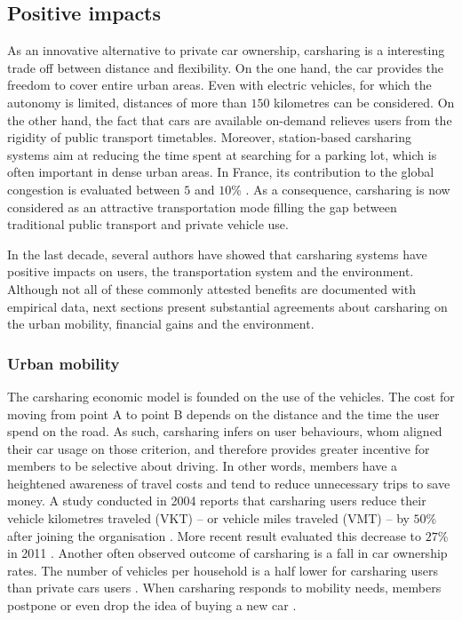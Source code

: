 \begin{bibunit}[ieeetr]
\subsection{Positive impacts}
As an innovative alternative to private car ownership, carsharing is a interesting trade off between distance and flexibility.
On the one hand, the car provides the freedom to cover entire urban areas.
Even with electric vehicles, for which the autonomy is limited, distances of more than $150$ kilometres can be considered.
On the other hand, the fact that cars are available on-demand relieves users from the rigidity of public transport timetables.
Moreover, station-based carsharing systems aim at reducing the time spent at searching for a parking lot, which is often important in dense urban areas.
In France, its contribution to the global congestion is evaluated between $5$ and $10$\%  \cite{stationnement_intelligent_cerema}.
As a consequence, carsharing is now considered as an attractive transportation mode filling the gap between traditional public transport and private vehicle use.

\medskip
In the last decade, several authors have showed that carsharing systems have positive impacts on users, the transportation system and the environment.
Although not all of these commonly attested benefits are documented with empirical data, next sections present substantial agreements about carsharing on the urban mobility, financial gains and the environment.


\subsubsection{Urban mobility}

The carsharing economic model is founded on the use of the vehicles.
The cost for moving from point A to point B depends on the distance and the time the user spend on the road.
As such, carsharing infers on user behaviours, whom aligned their car usage on those criterion, and therefore provides greater incentive for members to be selective about driving.
In other words, members have a heightened awareness of travel costs and tend to reduce unnecessary trips to save money.
A study conducted in 2004 reports that carsharing users reduce their vehicle kilometres traveled (VKT) -- or vehicle miles traveled (VMT) -- by $50$\% after joining the organisation \cite{cervero_city_2004}.
More recent result evaluated this decrease to $27$\% in 2011 \cite{martin_greenhouse_2011}.
Another often observed outcome of carsharing is a fall in car ownership rates.
The number of vehicles per household is a half lower for carsharing users than private cars users \cite{martin_impact_2010, ter_schure_cumulative_2012}.
When carsharing responds to mobility needs, members postpone or even drop the idea of buying a new car \cite{martin_impact_2010, sioui_carsharing_2013}.


\end{bibunit}
